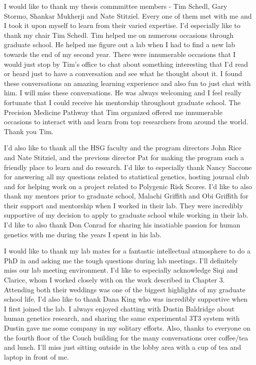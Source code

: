 I would like to thank  my thesis commmittee members - Tim Schedl, Gary Stormo, Shankar Mukherji and Nate Stitziel. Every one of them met with me and I took it upon myself to learn from their varied expertise. I'd especially like to thank my chair Tim Schedl. Tim helped me on numerous occasions through graduate school. He helped me figure out a lab when I had to find a new lab towards the end of my second year. There were innumerable occasions that I would just stop by Tim's office to chat about something interesting that I'd read or heard just to have a conversation and see what he thought about it. I found these conversations an amazing learning experience and also fun to just chat with him. I will miss these conversations. He was always welcoming and I feel really fortunate that I could receive his mentorship throughout graduate school. The Precision Medicine Pathway that Tim organized offered me innumerable occasions to interact with and learn from top researchers from around the world. Thank you Tim.

I'd also like to thank all the HSG faculty and the program directors John Rice and Nate Stitziel, and the previous director Pat for making the program such a friendly place to learn and do research. I'd like to especially thank Nancy Saccone for answering all my questions related to statistical genetics, hosting journal club and for helping work on a project related to Polygenic Risk Scores. I'd like to also thank my mentors prior to graduate school, Malachi Griffith and Obi Griffith for their support and mentorship when I worked in their lab. They were incredibly supportive of my decision to apply to graduate school while working in their lab. I'd like to also thank Don Conrad for sharing his insatiable passion for human genetics with me during the years I spent in his lab.

I would like to thank my lab mates for a fantastic intellectual atmosphere to do a PhD in and asking me the tough questions during lab meetings. I'll definitely miss our lab meeting environment. I'd like to especially acknowledge Siqi and Clarice, whom I worked closely with on the work described in Chapter 3. Attending both their weddings was one of the biggest highlights of my graduate school life. I'd also like to thank Dana King who was incredibly supportive when I first joined the lab. I always enjoyed chatting with Dustin Baldridge about human genetics research, and sharing the same experimental 3T3 system with Dustin gave me some company in my solitary efforts. Also, thanks to everyone on the fourth floor of the Couch building for the many conversations over coffee/tea and lunch. I'll miss just sitting outside in the lobby area with a cup of tea and laptop in front of me.


